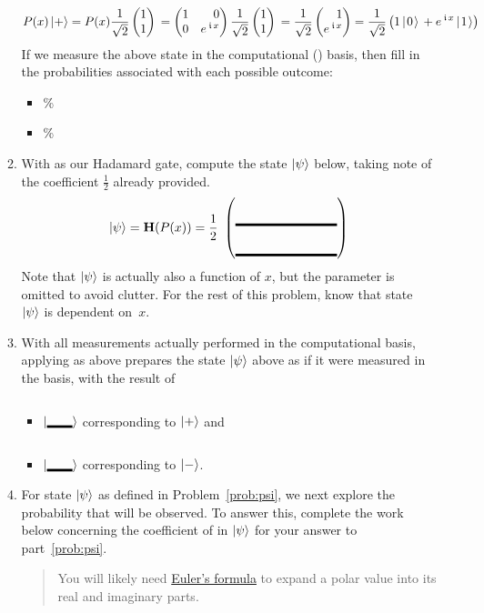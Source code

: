 \documentclass[12pt]{article}
\begin{document}
\begin{enumerate}
\begin{enumerate}[label=\theenumi.\arabic*]
\[  P(x)\ket{+} = P(x)\PPlus{}= \SQBG{\relax}{1}{0}{0}{\ExpPhase{x}}\PPlus{} =\RootTwo{}\SQB{1}{\ExpPhase{x}} = \TwoSupOp{1\QZero{}}{\ExpPhase{x}\QOne}{+}
  \]
  If we measure the above state in the computational (\PauliZ{}) basis, then fill in the probabilities associated with each possible outcome:
  \begin{itemize}
      \item \QZero{} \Blank{}\%
      \item \QOne{} \Blank{}\%
  \end{itemize}
  \item\label{prob:psi} With \Hadamard{} as our Hadamard gate, compute the state $\ket{\psi}$ below, taking note of the coefficient $\frac{1}{2}$ already provided.
  \[
  \ket{\psi} = \Hadamard(P(x)) = \frac{1}{2}\ \SQB{\Blank[8em]}{\Blank[8em]}
  \]
  Note that $\ket{\psi}$ is actually also a function of $x$, but the parameter is omitted to avoid clutter.  For the rest of this problem, know that state~$\ket{\psi}$ is dependent on~$x$.
  \item With all measurements actually performed in the computational basis, applying \Hadamard{} as above prepares the state $\ket{\psi}$ above as if it were measured in the \Blank[2em]{} basis, with the result of \begin{itemize}
      \item $\ket{\Blank[2em]}$ corresponding to $\ket{+}$ and 
      \item $\ket{\Blank[2em]}$  corresponding to $\ket{-}$.
   \end{itemize}
  \item For state $\ket{\psi}$ as defined in Problem~\ref{prob:psi}, we next explore the probability that \QZero{} will be observed.  To answer this, complete the work below concerning the coefficient of \QZero{} in $\ket{\psi}$ for your answer to part~\ref{prob:psi}.  
  \begin{quote}
  You will likely need \href{https://en.wikipedia.org/wiki/Euler%27s_formula}{Euler's formula} to expand a polar value into its real and imaginary parts. 
  \end{quote} 
  

\end{enumerate}
\end{enumerate}
\end{document}
